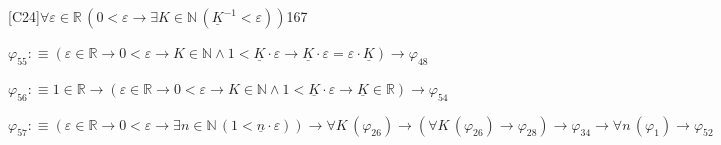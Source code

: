 \begin{fullproof}{[C24]}{$\forall \varepsilon \in \mathbb{R}\,(0 < \varepsilon \to \exists K \in \mathbb{N}\,(\underline{K}^{-1} < \varepsilon))$}{167}
\begin{abbrevlist}
\item $\varphi_{55} :\equiv (\varepsilon \in \mathbb{R} \to 0 < \varepsilon \to K \in \mathbb{N} \land 1 < \underline{K} \cdot \varepsilon \to \underline{K} \cdot \varepsilon = \varepsilon \cdot \underline{K}) \to \varphi_{48}$
\item $\varphi_{56} :\equiv 1 \in \mathbb{R} \to (\varepsilon \in \mathbb{R} \to 0 < \varepsilon \to K \in \mathbb{N} \land 1 < \underline{K} \cdot \varepsilon \to \underline{K} \in \mathbb{R}) \to \varphi_{54}$
\item $\varphi_{57} :\equiv (\varepsilon \in \mathbb{R} \to 0 < \varepsilon \to \exists n \in \mathbb{N}\,(1 < \underline{n} \cdot \varepsilon)) \to \forall K\,(\varphi_{26}) \to (\forall K\,(\varphi_{26}) \to \varphi_{28}) \to \varphi_{34} \to \forall n\,(\varphi_{1}) \to \varphi_{52}$
\end{abbrevlist}
\end{fullproof}
